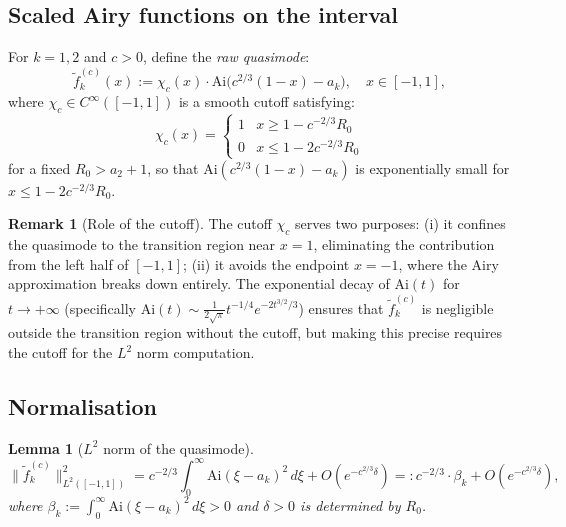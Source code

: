 \documentclass[12pt,a4paper]{amsart}
\newtheorem{lemma}[theorem]{Lemma}
\theoremstyle{definition}
\newtheorem{remark}[theorem]{Remark}
\newcommand{\Ai}{\mathrm{Ai}}
\newcommand{\norm}[1]{\|#1\|}
\begin{document}
\subsection{Scaled Airy functions on the interval}

For $k = 1, 2$ and $c > 0$, define the \emph{raw quasimode}:
\begin{equation}\label{eq:rawquasi}
  \tilde f_k^{(c)}(x)
  := \chi_c(x)\cdot \Ai\bigl(c^{2/3}(1-x) - a_k\bigr),
  \quad x \in [-1,1],
\end{equation}
where $\chi_c \in C^\infty([-1,1])$ is a smooth cutoff satisfying:
\begin{equation}\label{eq:cutoff}
  \chi_c(x) = \begin{cases}
    1 & x \geq 1 - c^{-2/3} R_0 \\
    0 & x \leq 1 - 2c^{-2/3} R_0
  \end{cases}
\end{equation}
for a fixed $R_0 > a_2 + 1$, so that $\Ai(c^{2/3}(1-x)-a_k)$ is
exponentially small for $x \leq 1 - 2c^{-2/3}R_0$.

\begin{remark}[Role of the cutoff]
The cutoff $\chi_c$ serves two purposes:
(i) it confines the quasimode to the transition region near $x=1$,
    eliminating the contribution from the left half of $[-1,1]$;
(ii) it avoids the endpoint $x = -1$, where the Airy approximation
    breaks down entirely.
The exponential decay of $\Ai(t)$ for $t \to +\infty$
(specifically $\Ai(t) \sim \frac{1}{2\sqrt{\pi}} t^{-1/4} e^{-2t^{3/2}/3}$)
ensures that $\tilde f_k^{(c)}$ is negligible outside the transition region
without the cutoff, but making this precise requires the cutoff for
the $L^2$ norm computation.
\end{remark}

\subsection{Normalisation}

\begin{lemma}[$L^2$ norm of the quasimode]\label{lem:norm}
\begin{equation}\label{eq:norm}
  \norm{\tilde f_k^{(c)}}_{L^2([-1,1])}^2
  = c^{-2/3}\int_0^\infty \Ai(\xi - a_k)^2\,d\xi + O(e^{-c^{2/3}\delta})
  =: c^{-2/3} \cdot \beta_k + O(e^{-c^{2/3}\delta}),
\end{equation}
where $\beta_k := \int_0^\infty \Ai(\xi-a_k)^2\,d\xi > 0$
and $\delta > 0$ is determined by $R_0$.
\end{lemma}
\end{document}
